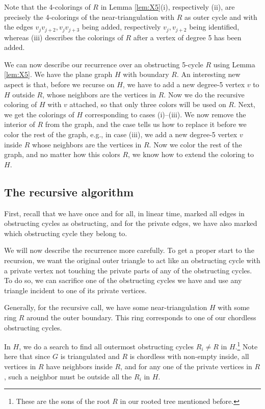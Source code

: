 \documentclass[10pt,a4paper]{article}
\begin{document}
Note that the 4-colorings of $R$ in Lemma \ref{lem:X5}(i), respectively (ii), are precisely the 4-colorings of the near-triangulation with $R$ as outer cycle and with the edges $v_jv_{j+2},v_jv_{j+3}$ being added, respectively $v_j,v_{j+2}$ being identified, whereas (iii) describes the colorings of $R$ after a vertex of degree 5 has been added.


We can now describe our recurrence over an obstructing 5-cycle $R$ using Lemma \ref{lem:X5}. We have the plane graph $H$ with boundary $R$. An interesting new aspect is that, before we recurse on $H$, we have to add a new degree-5 vertex $v$ to $H$ outside $R$, whose neighbors are the vertices in $R$. Now we do the recursive coloring of $H$ with $v$ attached, so that only three colors will be used on $R$. Next, we get the colorings of $H$ corresponding to cases (i)--(iii). We now remove the interior of $R$ from the graph, and the case tells us how to replace it before we color the rest of the graph, e.g., in case (iii), we add a new degree-5 vertex $v$ inside $R$ whose neighbors are the vertices in $R$. Now we color the rest of the graph, and no matter how this colors $R$, we know how to extend the coloring to $H$.

\subsection{The recursive algorithm}

First, recall that we have once and for all, in linear time, marked all edges in obstructing cycles as obstructing, and for the private edges, we have also marked which obstructing cycle they belong to. 

We will now describe the recurrence more carefully. 
To get a proper start to the recursion, we want the original outer triangle to act like an obstructing cycle with a private vertex not touching the private parts of any of the obstructing cycles. To do so, we can sacrifice one of the obstructing cycles we have and use any triangle incident to one of its private vertices.

Generally, for the recursive call, we have some near-triangulation $H$ with some ring $R$ around the outer boundary. This ring corresponds to one of our chordless obstructing cycles.

In $H$,  we do a search to find all outermost obstructing
cycles $R_i\neq R$ in $H$.\footnote{These are the sons of the root $R$ in our rooted tree mentioned before.}
Note here that since $G$ is triangulated and $R$ is chordless with non-empty inside, all vertices in $R$ have neighbors inside $R$, and for any one of the private vertices in $R$, such a neighbor must be outside all the $R_i$ in $H$.
\end{document}
